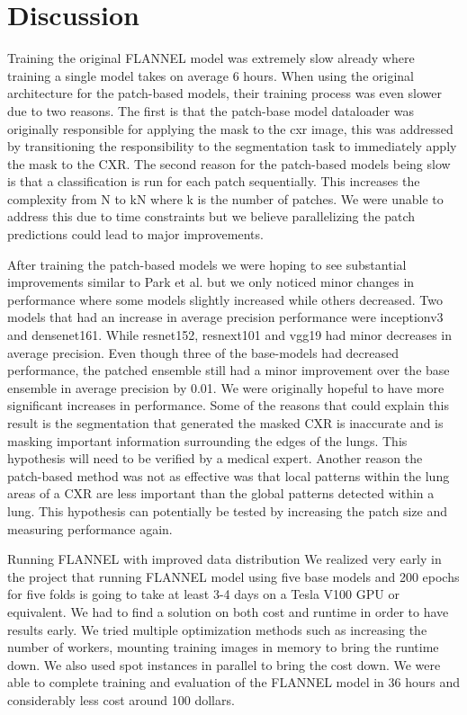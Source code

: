 \documentclass{sigkddExp}
\begin{document}
\section{Discussion}

Training the original FLANNEL model was extremely slow already where training a
single model takes on average 6 hours. When using the original architecture for
the patch-based models, their training process was even slower due to two
reasons. The first is that the patch-base model dataloader was originally
responsible for applying the mask to the cxr image, this was addressed by
transitioning the responsibility to the segmentation task to immediately apply
the mask to the CXR. The second reason for the patch-based models being slow is
that a classification is run for each patch sequentially. This increases the
complexity from N to kN where k is the number of patches. We were unable to
address this due to time constraints but we believe parallelizing the patch
predictions could lead to major improvements.

After training the patch-based models we were hoping to see substantial
improvements similar to Park et al. but we only noticed minor changes in
performance where some models slightly increased while others decreased. Two
models that had an increase in average precision performance were inceptionv3
and densenet161. While resnet152, resnext101 and vgg19 had minor decreases in
average precision. Even though three of the base-models had decreased
performance, the patched ensemble still had a minor improvement over the base
ensemble in average precision by 0.01. We were originally hopeful to have more
significant increases in performance. Some of the reasons that could explain
this result is the segmentation that generated the masked CXR is inaccurate and
is masking important information surrounding the edges of the lungs. This
hypothesis will need to be verified by a medical expert. Another reason the
patch-based method was not as effective was that local patterns within the lung
areas of a CXR are less important than the global patterns detected within a
lung. This hypothesis can potentially be tested by increasing the patch size and
measuring performance again.

Running FLANNEL with improved data distribution We realized very early in the
project that running FLANNEL model using five base models and 200 epochs for
five folds is going to take at least 3-4 days on a Tesla V100 GPU or
equivalent. We had to find a solution on both cost and runtime in order to have
results early. We tried multiple optimization methods such as increasing the
number of workers, mounting training images in memory to bring the runtime down.
We also used spot instances in parallel to bring the cost down. We were able to
complete training and evaluation of the FLANNEL model in 36 hours and
considerably less cost around 100 dollars.
\end{document}
